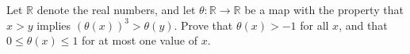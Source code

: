 Let $\mathbb{R}$ denote the real numbers, and let $\theta : \mathbb{R} \to
\mathbb{R}$ be a map with the property that $x > y$ implies $(\theta(x))^3 >
\theta(y)$. Prove that $\theta(x) > -1$ for all $x$, and that $0 \le \theta(x)
\le 1$ for at most one value of $x$.
